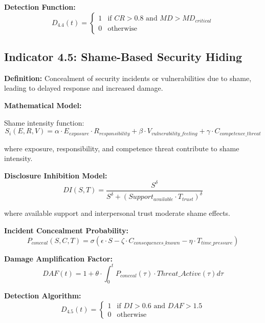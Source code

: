 \documentclass[11pt,a4paper]{article}
\begin{document}
\textbf{Detection Function:}
\begin{equation}
D_{4.4}(t) = \begin{cases}
1 & \text{if } CR > 0.8 \text{ and } MD > MD_{critical} \\
0 & \text{otherwise}
\end{cases}
\end{equation}

\subsection{Indicator 4.5: Shame-Based Security Hiding}

\textbf{Definition:} Concealment of security incidents or vulnerabilities due to shame, leading to delayed response and increased damage.

\textbf{Mathematical Model:}

Shame intensity function:
\begin{equation}
S_i(E,R,V) = \alpha \cdot E_{exposure} \cdot R_{responsibility} + \beta \cdot V_{vulnerability\_feeling} + \gamma \cdot C_{competence\_threat}
\end{equation}

where exposure, responsibility, and competence threat contribute to shame intensity.

\textbf{Disclosure Inhibition Model:}
\begin{equation}
DI(S,T) = \frac{S^{\delta}}{S^{\delta} + (Support_{available} \cdot T_{trust})^{\delta}}
\end{equation}

where available support and interpersonal trust moderate shame effects.

\textbf{Incident Concealment Probability:}
\begin{equation}
P_{conceal}(S,C,T) = \sigma\left(\epsilon \cdot S - \zeta \cdot C_{consequences\_known} - \eta \cdot T_{time\_pressure}\right)
\end{equation}

\textbf{Damage Amplification Factor:}
\begin{equation}
DAF(t) = 1 + \theta \cdot \int_0^t P_{conceal}(\tau) \cdot Threat\_Active(\tau) d\tau
\end{equation}

\textbf{Detection Algorithm:}
\begin{equation}
D_{4.5}(t) = \begin{cases}
1 & \text{if } DI > 0.6 \text{ and } DAF > 1.5 \\
0 & \text{otherwise}
\end{cases}
\end{equation}
\end{document}
